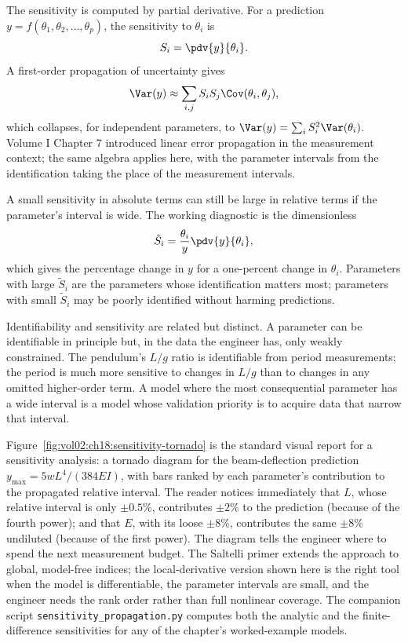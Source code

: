 The sensitivity is computed by partial derivative. For a
prediction $y = f(\theta_{1}, \theta_{2}, \ldots, \theta_{p})$,
the sensitivity to $\theta_{i}$ is
\[
S_{i} = \pdv{y}{\theta_{i}}.
\]
A first-order propagation of uncertainty gives
\[
\Var(y) \approx \sum_{i, j} S_{i} S_{j} \Cov(\theta_{i}, \theta_{j}),
\]
which collapses, for independent parameters, to
$\Var(y) = \sum_{i} S_{i}^{2} \Var(\theta_{i})$. Volume I Chapter 7
introduced linear error propagation in the measurement context;
the same algebra applies here, with the parameter intervals from
the identification taking the place of the measurement intervals.

A small sensitivity in absolute terms can still be large in
relative terms if the parameter's interval is wide. The
working diagnostic is the dimensionless 
\[
\tilde S_{i} = \frac{\theta_{i}}{y} \pdv{y}{\theta_{i}},
\]
which gives the percentage change in $y$ for a one-percent change
in $\theta_{i}$. Parameters with large $\tilde S_{i}$ are the
parameters whose identification matters most; parameters with
small $\tilde S_{i}$ may be poorly identified without harming
predictions.

Identifiability and sensitivity are related but distinct. A
parameter can be identifiable in principle but, in the data the
engineer has, only weakly constrained. The pendulum's $L/g$
ratio is identifiable from period measurements; the period is
much more sensitive to changes in $L/g$ than to changes in any
omitted higher-order term. A model where the most consequential
parameter has a wide interval is a model whose validation
priority is to acquire data that narrow that interval.



Figure~\ref{fig:vol02:ch18:sensitivity-tornado} is the standard
visual report for a sensitivity analysis: a tornado diagram for the
beam-deflection prediction $y_{\max} = 5 w L^{4} / (384 E I)$, with
bars ranked by each parameter's contribution to the propagated
relative interval. The reader notices immediately that $L$, whose
relative interval is only $\pm 0.5\%$, contributes $\pm 2\%$ to the
prediction (because of the fourth power); and that $E$, with its
loose $\pm 8\%$, contributes the same $\pm 8\%$ undiluted (because
of the first power). The diagram tells the engineer where to spend
the next measurement budget. The Saltelli primer
\cite{text:v2ch18-saltelli-sensitivity-2008} extends the approach to
global, model-free indices; the local-derivative version shown here
is the right tool when the model is differentiable, the parameter
intervals are small, and the engineer needs the rank order rather
than full nonlinear coverage. The companion script
\texttt{sensitivity\_propagation.py} computes both the analytic and
the finite-difference sensitivities for any of the chapter's
worked-example models.

